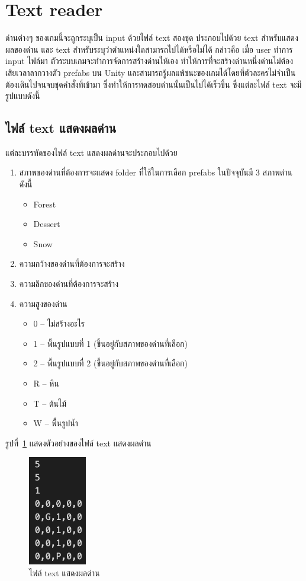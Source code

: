 \section{Text reader}
ด่านต่างๆ ของเกมนี้จะถูกระบุเป็น input ด้วยไฟล์ text สองชุด ประกอบไปด้วย text สำหรับแสดงผลของด่าน และ text สำหรับระบุว่าตำแหน่งใดสามารถไปได้หรือไม่ได้ กล่าวคือ เมื่อ user ทำการ input ไฟล์มา ตัวระบบเกมจะทำการจัดการสร้างด่านให้เอง
ทำให้การที่จะสร้างด่านหนึ่งด่านไม่ต้องเสียเวลาลากวางตัว prefabs บน Unity และสามารถรู้ผลแพ้ชนะของเกมได้โดยที่ตัวละครไม่จำเป็นต้องเดินไปจนจบชุดคำสั่งที่เข้ามา ซึ่งทำให้การทดสอบด่านนั้นเป็นไปได้เร็วขึ้น
ซึ่งแต่ละไฟล์ text จะมีรูปแบบดังนี้

\subsection{ไฟล์ text แสดงผลด่าน}
แต่ละบรรทัดของไฟล์ text แสดงผลด่านจะประกอบไปด้วย
\begin{enumerate}
    \item สภาพของด่านที่ต้องการจะแสดง folder ที่ใช้ในการเลือก prefabs ในปัจจุบันมี 3 สภาพด่าน ดังนี้
    \begin{itemize}
        \item Forest
        \item Dessert
        \item Snow
    \end{itemize}
    \item ความกว้างของด่านที่ต้องการจะสร้าง
    \item ความลึกของด่านที่ต้องการจะสร้าง
    \item ความสูงของด่าน
    \begin{itemize}
        \item 0 -- ไม่สร้างอะไร
        \item 1 -- พื้นรูปแบบที่ 1 (ขึ้นอยู่กับสภาพของด่านที่เลือก)
        \item 2 -- พื้นรูปแบบที่ 2 (ขึ้นอยู่กับสภาพของด่านที่เลือก)
        \item R -- หิน
        \item T -- ต้นไม้
        \item W -- พื้นรูปน้ำ
    \end{itemize}
\end{enumerate}
รูปที่~\ref{ft1} แสดงตัวอย่างของไฟล์ text แสดงผลด่าน
\begin{figure}[h!]
    \begin{center}
    \includegraphics[width=1in]{pic-toro/filetext1.png}
    \end{center}
    \caption[ไฟล์ text แสดงผลด่าน]{ไฟล์ text แสดงผลด่าน}
    \label{ft1}
    \end{figure}

